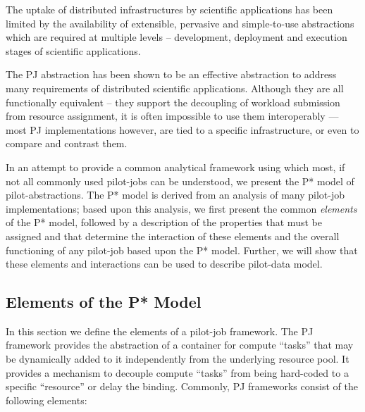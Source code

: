 \documentclass[conference,final]{IEEEtran}
\newcommand{\upp}{\vspace*{-0.5em}}
\begin{document}


The uptake of distributed infrastructures by scientific
applications has been limited by the availability of extensible,
pervasive and simple-to-use abstractions which are required at
multiple levels – development, deployment and execution stages of
scientific applications.


The PJ abstraction has been shown to be an effective
abstraction to address many requirements of distributed scientific
applications. Although they are all functionally equivalent -- they
support the decoupling of workload submission from resource
assignment, it is often impossible to use them interoperably --- most
PJ implementations however, are tied to a specific
infrastructure, or even to compare and contrast them.

In an attempt to provide a common analytical framework using which
most, if not all commonly used pilot-jobs can be understood, we
present the P* model of pilot-abstractions. The P* model is derived
from an analysis of many pilot-job implementations; based upon this analysis, we
first present the common {\it elements} of the P* model, followed by
a description of the properties that must be assigned and that
determine the interaction of these elements and the overall
functioning of any pilot-job based upon the P* model. Further, we will show
that these elements and interactions can be used to describe pilot-data
model.

\subsection{Elements of the P* Model \upp\upp}

In this section we define the elements of a pilot-job framework. The PJ
framework provides the abstraction of a container for compute ``tasks''
that may be dynamically added to it independently from the underlying resource
pool. It provides a mechanism to decouple compute ``tasks'' from being
hard-coded to a specific ``resource'' or delay the binding. Commonly, PJ 
frameworks consist of the following elements:
\end{document}
